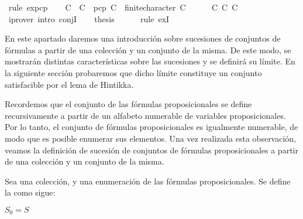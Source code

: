 \begin{isabellebody}
\ {\isacharparenleft}rule\ ex{}{\isacharunderscore}pcp{\isacharparenright}\isanewline
\ \ \isamarkupfalse%
\ {\isachardoublequoteopen}C\ {\isasymsubseteq}\ {\isacharquery}C{\isacharprime}\ {\isasymand}\ pcp\ {\isacharquery}C{\isacharprime}\ {\isasymand}\ finite{\isacharunderscore}character\ {\isacharquery}C{\isacharprime}{\isachardoublequoteclose}\isanewline
\ \ \ \ \isamarkupfalse%
\ C{}\ C{}\ C{}\ \isamarkupfalse%
\ {\isacharparenleft}iprover\ intro{\isacharcolon}\ conjI{\isacharparenright}\isanewline
\ \ \isamarkupfalse%
\ {\isacharquery}thesis\isanewline
\ \ \ \ \isamarkupfalse%
\ {\isacharparenleft}rule\ exI{\isacharparenright}\isanewline
{}\isamarkupfalse%
%
\endisatagproof
{\isafoldproof}%
%
\isadelimproof
%
\endisadelimproof
%
\isadelimdocument
%
\endisadelimdocument
%
\isatagdocument
%
\isamarkuptrue%
%
\endisatagdocument
{\isafolddocument}%
%
\isadelimdocument
%
\endisadelimdocument
%
\begin{isamarkuptext}%
En este apartado daremos una introducción sobre sucesiones de conjuntos de fórmulas a 
  partir de una colección y un conjunto de la misma. De este modo, se mostrarán distintas 
  características sobre las sucesiones y se definirá su límite. En la siguiente sección 
  probaremos que dicho límite constituye un conjunto satisfacible por el lema de Hintikka.


  Recordemos que el conjunto de las fórmulas proposicionales se define recursivamente a partir 
  de un alfabeto numerable de variables proposicionales. Por lo tanto, el conjunto de fórmulas 
  proposicionales es igualmente numerable, de modo que es posible enumerar sus elementos. Una vez 
  realizada esta observación, veamos la definición de sucesión de conjuntos de fórmulas 
  proposicionales a partir de una colección y un conjunto de la misma.

\begin{definicion}
  Sea  una colección,  y  una enumeración de 
  las fórmulas proposicionales. Se define la  como sigue:

  $S_{0} = S$


\end{definicion}
\end{isamarkuptext}
\end{isabellebody}

